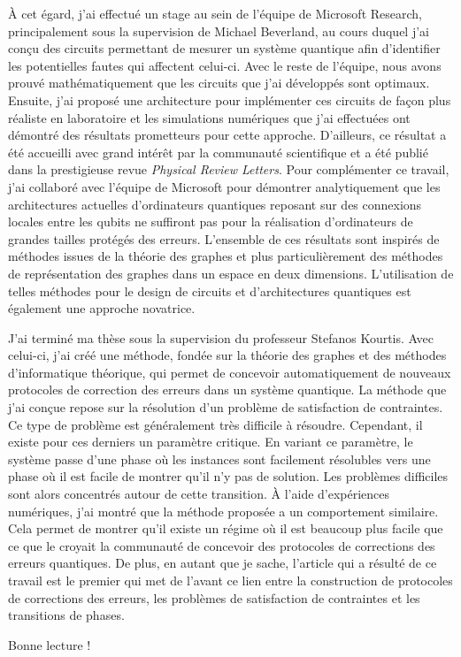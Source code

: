À cet égard, j'ai effectué un stage au sein de l'équipe de Microsoft Research,
principalement sous la supervision de Michael Beverland, au cours duquel j'ai conçu
des circuits permettant de mesurer un système quantique afin d'identifier les
potentielles fautes qui affectent celui-ci. 
Avec le reste de l'équipe, nous avons prouvé mathématiquement
que les circuits que j'ai développés sont optimaux.
Ensuite, j'ai proposé une architecture pour implémenter ces circuits
de façon plus réaliste en laboratoire
et les simulations numériques que j'ai effectuées ont démontré des résultats 
prometteurs pour cette approche. 
D'ailleurs, ce résultat a été accueilli avec grand intérêt par la communauté
scientifique et a été publié dans la prestigieuse revue \textit{Physical Review Letters}.
Pour complémenter ce travail,
j'ai collaboré avec l'équipe de Microsoft pour démontrer analytiquement 
que les architectures actuelles d'ordinateurs quantiques reposant sur des connexions
locales entre les qubits ne suffiront pas pour la réalisation d'ordinateurs de grandes
tailles protégés des erreurs.
L'ensemble de ces résultats sont inspirés de méthodes issues de la théorie des graphes
et plus particulièrement des méthodes de représentation des graphes dans un espace en 
deux dimensions.
L'utilisation de telles méthodes pour le design de circuits et d'architectures quantiques
est également une approche novatrice.

J'ai terminé ma thèse sous la supervision du professeur Stefanos Kourtis.
Avec celui-ci, j'ai créé une méthode, 
fondée sur la théorie des graphes et des méthodes d'informatique théorique,
qui permet de concevoir automatiquement de nouveaux protocoles de 
correction des erreurs dans un système quantique.
La méthode que j'ai conçue repose sur la résolution d'un problème 
de satisfaction de contraintes.
Ce type de problème est généralement très difficile à résoudre.
Cependant,
il existe pour ces derniers un paramètre critique. 
En variant ce paramètre, 
le système passe d'une phase où les instances sont facilement résolubles 
vers une phase où il est facile de montrer qu'il n'y pas de solution.
Les problèmes difficiles sont alors concentrés autour de cette transition.
À l'aide d'expériences numériques,
j'ai montré que la méthode proposée a un comportement similaire.
Cela permet de montrer qu'il existe un régime où il est beaucoup plus facile 
que ce que le croyait la communauté de concevoir des protocoles de corrections
des erreurs quantiques.
De plus,
en autant que je sache,
l'article qui a résulté de ce travail est le premier qui met de l'avant
ce lien entre la construction de protocoles de corrections des erreurs,
les problèmes de satisfaction de contraintes et les transitions de phases.

Bonne lecture !
